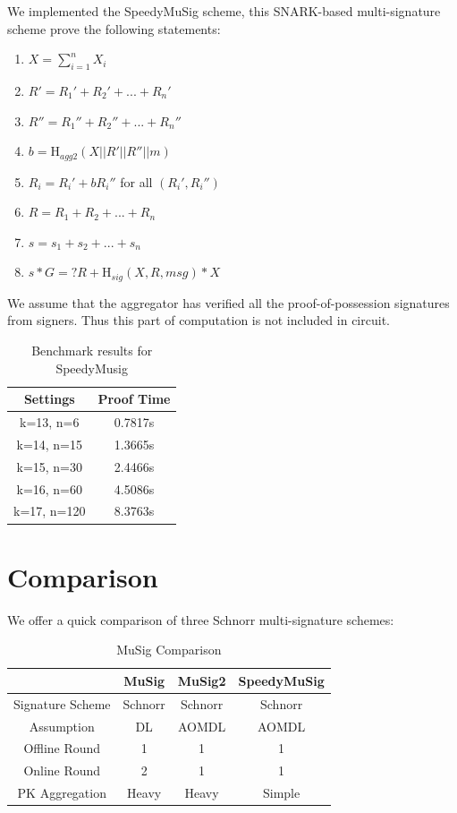 \documentclass{article}
\begin{document}
We implemented the SpeedyMuSig scheme, this SNARK-based multi-signature scheme prove the following statements:

\begin{enumerate}
    \item $X = \sum_{i=1}^{n} X_i$
    \item $R' = R_1' + R_2' +...+ R_n'$
    \item $R'' = R_1'' + R_2'' +...+ R_n''$
    \item $b = \textrm{H}_{agg2}(X||R'||R''||m)$
    \item $R_i = R_i'+bR_i''$ for all $(R_i',R_i'')$
    \item $R = R_1 + R_2 +...+ R_n$
    \item $s = s_1 + s_2 + ... + s_n$
    \item $s*G =? R+\textrm{H}_{sig}(X, R, msg)*X$
\end{enumerate} 

We assume that the aggregator has verified all the proof-of-possession signatures from signers. Thus this part of computation is not included in circuit.



\begin{table}[H]
    \centering
    \begin{tabular}{c|c} \hline
        Settings & Proof Time \\ \hline
        k=13, n=6 & 0.7817s \\ \hline
        k=14, n=15 & 1.3665s \\ \hline
        k=15, n=30 & 2.4466s \\ \hline
        k=16, n=60 & 4.5086s  \\ \hline
        k=17, n=120 & 8.3763s \\ \hline
    \end{tabular}
    \caption{Benchmark results for SpeedyMusig}
    \label{tab:version1_agg}
\end{table}

\section{Comparison}

We offer a quick comparison of three Schnorr multi-signature schemes:


\begin{table}[H]
    \centering
    \begin{tabular}{|c|c|c|c|} \hline
        & MuSig & MuSig2 & SpeedyMuSig \\ \hline
       Signature Scheme& Schnorr &Schnorr &Schnorr \\ \hline
       Assumption & DL & AOMDL & AOMDL \\ \hline
       Offline Round & 1 &1 & 1 \\ \hline
       Online Round & 2 & 1 & 1 \\ \hline
       PK Aggregation & Heavy & Heavy & Simple \\ \hline
    \end{tabular}
    \caption{MuSig Comparison}
    \label{tab:version1_agg}
\end{table}
\end{document}
